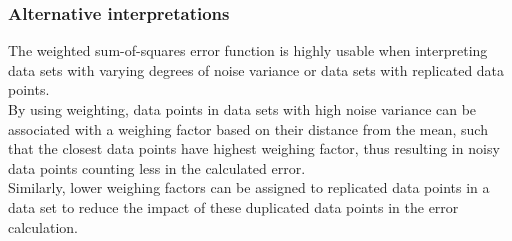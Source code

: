\documentclass[a4paper]{article}
\begin{document}
\subsubsection{Alternative interpretations}
The weighted sum-of-squares error function is highly usable when interpreting data sets with varying degrees of noise variance or data sets with replicated data points.\\

By using weighting, data points in data sets with high noise variance can be associated with a weighing factor based on their distance from the mean, such that the closest data points have highest weighing factor, thus resulting in noisy data points counting less in the calculated error.\\

Similarly, lower weighing factors can be assigned to replicated data points in a data set to reduce the impact of these duplicated data points in the error calculation.
\end{document}
